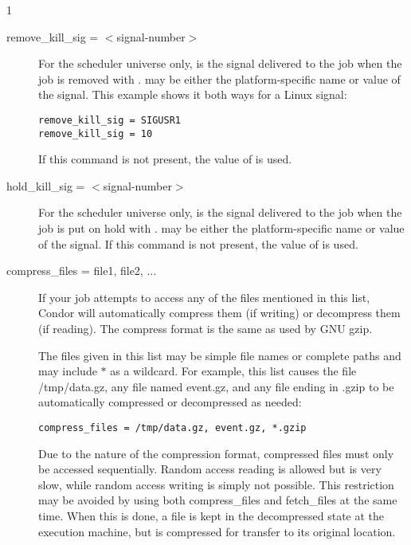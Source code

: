 \begin{ManPage}{\label{man-condor-submit}}{1}
\begin{description}
\item[remove\_kill\_sig = $<$signal-number$>$] For the scheduler universe only,
 is the signal delivered
to the job when the job is removed
with .
 may be either the platform-specific name or value
of the signal.
This example shows it both ways for a Linux signal:
\begin{verbatim}
remove_kill_sig = SIGUSR1
remove_kill_sig = 10
\end{verbatim}
If this command is not present,
the value of  is used. 


\item[hold\_kill\_sig = $<$signal-number$>$] For the scheduler universe only,
 is the signal delivered
to the job when the job is put on hold
with .
 may be either the platform-specific name or value
of the signal.
If this command is not present,
the value of  is used. 


\item[compress\_files = file1, file2, ...]

If your job attempts to access any of the files mentioned in this list,
Condor will automatically compress them (if writing) or decompress them (if reading).
The compress format is the same as used by GNU gzip.

The files given in this list may be simple file names or complete paths and may
include $*$ as a wildcard.  For example, this list causes the file /tmp/data.gz,
any file named event.gz, and any file ending in .gzip to be automatically
compressed or decompressed as needed:

\begin{verbatim}
compress_files = /tmp/data.gz, event.gz, *.gzip
\end{verbatim}

Due to the nature of the compression format, compressed files must only
be accessed sequentially.  Random access reading is allowed but is very slow,
while random access writing is simply not possible.  This restriction may be
avoided by using both compress\_files and fetch\_files at the same time.  When
this is done, a file is kept in the decompressed state at the execution
machine, but is compressed for transfer to its original location.


\end{description}
\end{ManPage}
